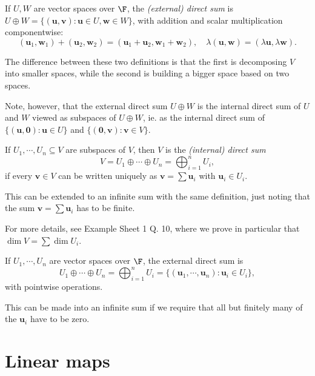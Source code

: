 \documentclass[a4paper]{article}
\begin{document}
\begin{defi}
  If $U, W$ are vector spaces over $\F$, the \emph{(external) direct sum} is $U\oplus W = \{(\mathbf{u}, \mathbf{v}): \mathbf{u}\in U, \mathbf{w}\in W\}$, with addition and scalar multiplication componentwise:
  \[
    (\mathbf{u}_1, \mathbf{w}_1) + (\mathbf{u}_2, \mathbf{w}_2) = (\mathbf{u}_1 + \mathbf{u}_2, \mathbf{w}_1 + \mathbf{w}_2),\quad \lambda (\mathbf{u}, \mathbf{w}) = (\lambda \mathbf{u}, \lambda \mathbf{w}).
  \]
\end{defi}
The difference between these two definitions is that the first is decomposing $V$ into smaller spaces, while the second is building a bigger space based on two spaces.

Note, however, that the external direct sum $U\oplus W$ is the internal direct sum of $U$ and $W$ viewed as subspaces of $U\oplus W$, ie. as the internal direct sum of $\{(\mathbf{u}, \mathbf{0}): \mathbf{u}\in U\}$ and $\{(\mathbf{0}, \mathbf{v}): \mathbf{v}\in V\}$.

\begin{defi}
  If $U_1, \cdots, U_n\subseteq V$ are subspaces of $V$, then $V$ is the \emph{(internal) direct sum}
  \[
    V = U_1 \oplus \cdots \oplus U_n = \bigoplus_{i = 1}^n U_i,
  \]
  if every $\mathbf{v}\in V$ can be written uniquely as $\mathbf{v} = \sum \mathbf{u}_i$ with $\mathbf{u}_i \in U_i$.

  This can be extended to an infinite sum with the same definition, just noting that the sum $\mathbf{v} = \sum \mathbf{u}_i$ has to be finite.
\end{defi}
For more details, see Example Sheet 1 Q. 10, where we prove in particular that $\dim V = \sum \dim U_i$.

\begin{defi}
  If $U_1, \cdots, U_n$ are vector spaces over $\F$, the external direct sum is
  \[
    U_1 \oplus \cdots \oplus U_n = \bigoplus_{i = 1}^n U_i = \{(\mathbf{u}_1, \cdots, \mathbf{u}_n): \mathbf{u}_i \in U_i\},
  \]
  with pointwise operations.

  This can be made into an infinite sum if we require that all but finitely many of the $\mathbf{u}_i$ have to be zero.
\end{defi}

\section{Linear maps}
\end{document}
